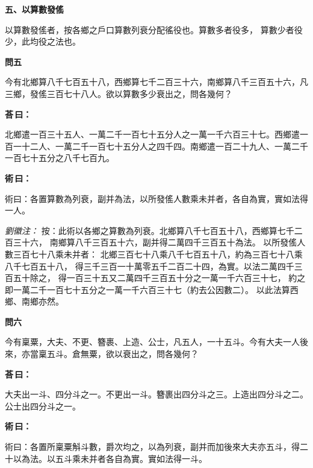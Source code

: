 \documentclass[11pt,a4paper]{article}
\newenvironment{problem}[1][]{%
  \par\vspace{0.6em}\noindent\textcolor{problemcolor}{\textbf{問\ignorespaces#1\unskip}\hspace{0.5em}}%
  \ignorespaces
}{\par\vspace{0.4em}}
\newenvironment{answer}{%
  \par\noindent\textcolor{answercolor}{\textbf{荅\,曰：}}%
  \ignorespaces
}{\par\vspace{0.3em}}
\newenvironment{method}{%
  \par\noindent\textcolor{methodcolor}{\textbf{術\,曰：}}%
  \ignorespaces
}{\par\vspace{0.4em}}
\newenvironment{liuhuicomm}{%
  \par\vspace{0.3em}\noindent\textcolor{commentarycolor}{\small\textit{劉徽注：}}}%
  {\par\vspace{0.5em}}
\begin{document}
\vspace{0.8em}
\noindent\textbf{\large 五、以算數發傜}
\vspace{0.5em}

\noindent 以算數發傜者，按各鄉之戶口算數列衰分配徭役也。算數多者役多，
算數少者役少，此均役之法也。

\begin{problem}[五]
今有北鄉算八千七百五十八，西鄉算七千二百三十六，南鄉算八千三百五十六，凡三鄉，發傜三百七十八人。欲以算數多少衰出之，問各幾何？
\end{problem}

\begin{answer}
北鄉遣一百三十五人、一萬二千一百七十五分人之一萬一千六百三十七。西鄉遣一百一十二人、一萬二千一百七十五分人之四千四。南鄉遣一百二十九人、一萬二千一百七十五分之八千七百九。
\end{answer}

\begin{method}
術曰：各置算數為列衰，副并為法，以所發傜人數乘未并者，各自為實，實如法得一人。
\end{method}

\begin{liuhuicomm}
按：此術以各鄉之算數為列衰。北鄉算八千七百五十八，西鄉算七千二百三十六，
南鄉算八千三百五十六，副并得二萬四千三百五十為法。
以所發傜人數三百七十八乘未并者：
北鄉三百七十八乘八千七百五十八，約為三百七十八乘八千七百五十八，
得三千三百一十萬零五千二百二十四，為實。以法二萬四千三百五十除之，
得一百三十五又二萬四千三百五十分之一萬一千六百三十七，
約之即一萬二千一百七十五分之一萬一千六百三十七（約去公因數二）。
以此法算西鄉、南鄉亦然。
\end{liuhuicomm}

\begin{problem}[六]
今有稟粟，大夫、不更、簪裹、上造、公士，凡五人，一十五斗。今有大夫一人後來，亦當稟五斗。倉無粟，欲以衰出之，問各幾何？
\end{problem}

\begin{answer}
大夫出一斗、四分斗之一。不更出一斗。簪裹出四分斗之三。上造出四分斗之二。公士出四分斗之一。
\end{answer}

\begin{method}
術曰：各置所稟粟斛斗數，爵次均之，以為列衰，副并而加後來大夫亦五斗，得二十以為法。以五斗乘未并者各自為實。實如法得一斗。
\end{method}
\end{document}
